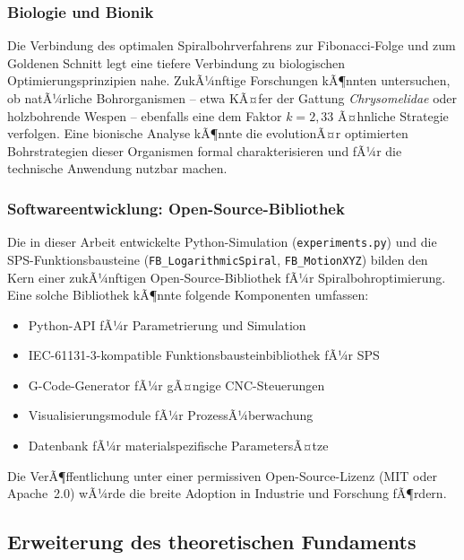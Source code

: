 ﻿\documentclass[12pt,a4paper]{article}
\begin{document}
\subsubsection{Biologie und Bionik}

Die Verbindung des optimalen Spiralbohrverfahrens zur Fibonacci-Folge und zum Goldenen Schnitt legt eine tiefere Verbindung zu biologischen Optimierungsprinzipien nahe. ZukÃ¼nftige Forschungen kÃ¶nnten untersuchen, ob natÃ¼rliche Bohrorganismen -- etwa KÃ¤fer der Gattung \textit{Chrysomelidae} oder holzbohrende Wespen -- ebenfalls eine dem Faktor $k = 2{,}33$ Ã¤hnliche Strategie verfolgen. Eine bionische Analyse kÃ¶nnte die evolutionÃ¤r optimierten Bohrstrategien dieser Organismen formal charakterisieren und fÃ¼r die technische Anwendung nutzbar machen.

\subsubsection{Softwareentwicklung: Open-Source-Bibliothek}

Die in dieser Arbeit entwickelte Python-Simulation (\texttt{experiments.py}) und die SPS-Funktionsbausteine (\texttt{FB\_\allowbreak{}Logarithmic\allowbreak{}Spiral}, \texttt{FB\_\allowbreak{}MotionXYZ}) bilden den Kern einer zukÃ¼nftigen Open-Source-Bibliothek fÃ¼r Spiralbohroptimierung. Eine solche Bibliothek kÃ¶nnte folgende Komponenten umfassen:
\begin{itemize}
    \item Python-API fÃ¼r Parametrierung und Simulation
    \item IEC-61131-3-kompatible Funktionsbausteinbibliothek fÃ¼r SPS
    \item G-Code-Generator fÃ¼r gÃ¤ngige CNC-Steuerungen
    \item Visualisierungsmodule fÃ¼r ProzessÃ¼berwachung
    \item Datenbank fÃ¼r materialspezifische ParametersÃ¤tze
\end{itemize}
Die VerÃ¶ffentlichung unter einer permissiven Open-Source-Lizenz (MIT oder Apache~2.0) wÃ¼rde die breite Adoption in Industrie und Forschung fÃ¶rdern.

\subsection{Erweiterung des theoretischen Fundaments}
\end{document}
